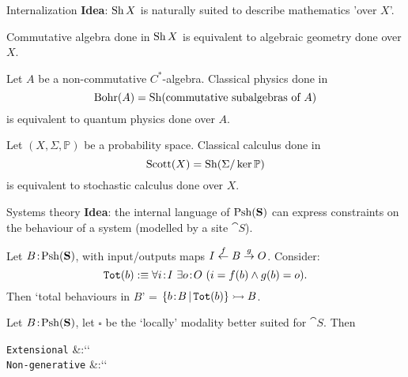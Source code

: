\begin{frame}{Internalization}
	\textbf{Idea}: $\operatorname{Sh} X$ is naturally suited to describe mathematics 'over $X$'.

	\begin{example}
		Commutative algebra done in $\operatorname{Sh} X$ is equivalent to algebraic geometry done over $X$.
	\end{example}
	\begin{example}
		Let $A$ be a non-commutative $C^*$-algebra.
		Classical physics done in
		\begin{equation*}
			\operatorname{Bohr}(A) = \operatorname{Sh}(\text{commutative subalgebras of $A$})
		\end{equation*}
		is equivalent to quantum physics done over $A$.
	\end{example}
	\begin{example}
		Let $(X,\Sigma, \mathbb P)$ be a probability space. Classical calculus done in
		\begin{equation*}
			\operatorname{Scott}(X) = \operatorname{Sh} (\Sigma / \ker \mathbb{P})
		\end{equation*}
		is equivalent to stochastic calculus done over $X$.
	\end{example}
\end{frame}

\begin{frame}{Systems theory}
	\textbf{Idea}: the internal language of $\operatorname{Psh}(\mathbf{S})$ can express constraints on the behaviour of a system (modelled by a site $\cat S$).

	\begin{example}
		Let $B \!:\! \operatorname{Psh}(\mathbf{S})$, with input/outputs maps $I \overset{f}{\leftarrow} B \overset{g}{\to} O$. Consider:
		\begin{equation*}
			\texttt{Tot}(b) :\equiv \forall i \!:\! I\ \exists o \!:\! O\ (i = f(b) \land g(b) = o).
		\end{equation*}
		Then `total behaviours in $B$' = $\{ b \!:\! B \,|\, \texttt{Tot}(b)\} \rightarrowtail B$.
	\end{example}
	\begin{example}
		Let $B \!:\! \operatorname{Psh} (\mathbf{S})$, let $\square$ be the `locally' modality better suited for $\cat S$. Then
		\begin{eqalign*}
			\texttt{Extensional} &:\equiv ``\\
			\texttt{Non-generative} &:\equiv ``
		\end{eqalign*}
	\end{example}
\end{frame}
